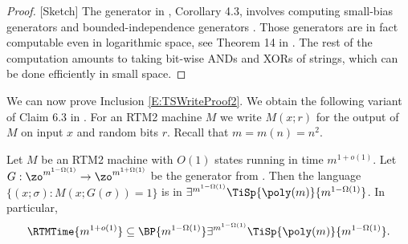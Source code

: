 \begin{proof}
{[}Sketch{]} The generator in \cite{ForbesKelley-2018}, Corollary
4.3, involves computing small-bias generators \cite{NaN93,AGHP92}
and bounded-independence generators \cite{ChG89,ABI86}. Those generators
are in fact computable even in logarithmic space, see Theorem 14 in
\cite{HeV06}. The rest of the computation amounts to taking bit-wise
ANDs and XORs of strings, which can be done efficiently in small space.
\end{proof}
We can now prove Inclusion \eqref{E:TSWriteProof2}. We obtain the
following variant of Claim 6.3 in \cite{ViolaBPvsE}. For an RTM2
machine $M$ we write $M(x;r)$ for the output of $M$ on input $x$
and random bits $r$. Recall that $m=m(n)=n^{2}$.
\begin{claim}
\label{claim:RTM-in-TiSp} Let $M$ be an RTM2 machine with $O(1)$
states running in time $m^{1+o(1)}$. Let $G:\zo^{m^{1-\Omega(1)}}\to\zo^{m^{1+\Omega(1)}}$
be the generator from . Then the language
$\{(x;\sigma):M(x;G(\sigma))=1\}$ is in $\exists^{m^{1-\Omega(1)}}\TiSp{\poly(m)}{m^{1-\Omega(1)}}$.
In particular,
\[
\RTMTime{m^{1+o(1)}}\subseteq\BP{m^{1-\Omega(1)}}\exists^{m^{1-\Omega(1)}}\TiSp{\poly(m)}{m^{1-\Omega(1)}}.
\]
\end{claim}

